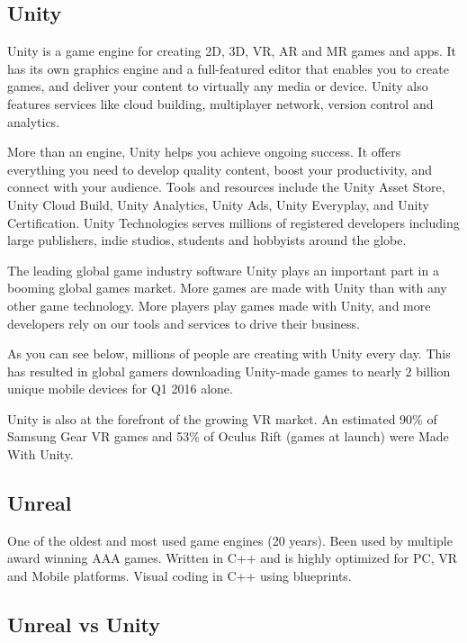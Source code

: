     \subsection{Unity}
    Unity is a game engine for creating 2D, 3D, VR, AR and MR games and apps. It has its own graphics engine and a full-featured editor that enables you to create games, and deliver your content to virtually any media or device. Unity also features services like cloud building, multiplayer network, version control and analytics.

    More than an engine, Unity helps you achieve ongoing success. It offers everything you need to develop quality content, boost your productivity, and connect with your audience. Tools and resources include the Unity Asset Store, Unity Cloud Build, Unity Analytics, Unity Ads, Unity Everyplay, and Unity Certification. Unity Technologies serves millions of registered developers including large publishers, indie studios, students and hobbyists around the globe.
    
    The leading global game industry software
    Unity plays an important part in a booming global games market. More games are made with Unity than with any other game technology. More players play games made with Unity, and more developers rely on our tools and services to drive their business.
    
    As you can see below, millions of people are creating with Unity every day. This has resulted in global gamers downloading Unity-made games to nearly 2 billion unique mobile devices for Q1 2016 alone.
    
    Unity is also at the forefront of the growing VR market. An estimated 90\% of Samsung Gear VR games and 53\% of Oculus Rift (games at launch) were Made With Unity. %
    
    \subsection{Unreal}
    One of the oldest and most used game engines (20 years). Been used by multiple award winning AAA games. Written in C++ and is highly optimized for PC, VR and Mobile platforms.
    Visual coding in C++ using blueprints.

    \subsection{Unreal vs Unity}

